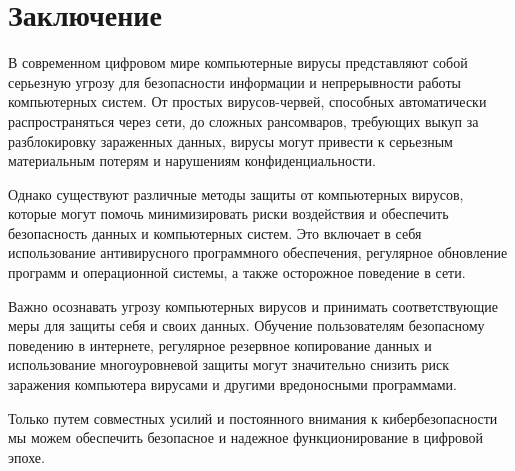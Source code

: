 \section{Заключение}

В современном цифровом мире компьютерные вирусы представляют собой серьезную угрозу для безопасности информации и непрерывности работы компьютерных систем. От простых вирусов-червей, способных автоматически распространяться через сети, до сложных рансомваров, требующих выкуп за разблокировку зараженных данных, вирусы могут привести к серьезным материальным потерям и нарушениям конфиденциальности.

Однако существуют различные методы защиты от компьютерных вирусов, которые могут помочь минимизировать риски воздействия и обеспечить безопасность данных и компьютерных систем. Это включает в себя использование антивирусного программного обеспечения, регулярное обновление программ и операционной системы, а также осторожное поведение в сети.

Важно осознавать угрозу компьютерных вирусов и принимать соответствующие меры для защиты себя и своих данных. Обучение пользователям безопасному поведению в интернете, регулярное резервное копирование данных и использование многоуровневой защиты могут значительно снизить риск заражения компьютера вирусами и другими вредоносными программами.

Только путем совместных усилий и постоянного внимания к кибербезопасности мы можем обеспечить безопасное и надежное функционирование в цифровой эпохе.

